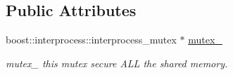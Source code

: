 \subsection*{Public Attributes}
\begin{DoxyCompactItemize}
\item 
\mbox{\label{classshared__memory_1_1SharedMemorySegment_a9e72fec52b3c76b9c2b0809b40b4e11d}} 
boost\+::interprocess\+::interprocess\+\_\+mutex $\ast$ \hyperlink{classshared__memory_1_1SharedMemorySegment_a9e72fec52b3c76b9c2b0809b40b4e11d}{mutex\+\_\+}
\begin{DoxyCompactList}\small\item\em mutex\+\_\+ this mutex secure A\+LL the shared memory. \end{DoxyCompactList}\end{DoxyCompactItemize}
